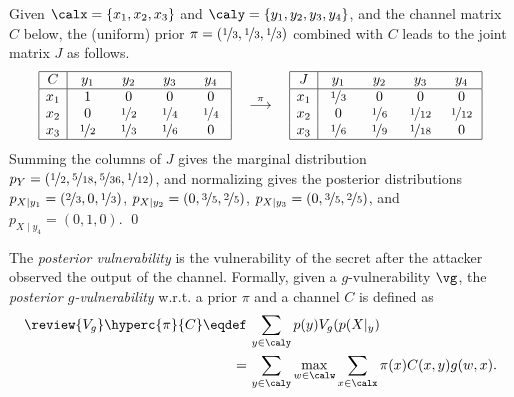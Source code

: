 \begin{example}
\label{exa:hypers}
Given $\calx=\{x_{1},x_{2},x_{3}\}$ and $\caly=\{y_{1},y_{2},y_{3},y_{4}\}$, 
and the channel matrix $C$ below, the (uniform) prior 
$\pi = (\nicefrac{1}{3}, \nicefrac{1}{3}, \nicefrac{1}{3})$ combined with
$C$ leads to the joint matrix $J$ as follows.
\begin{align*}
\begin{array}{|c|cccc|}
\hline
C & \,\,\,y_{1}\,\,\, & \,\,\,y_{2}\,\,\, & \,\,\,y_{3}\,\,\, & \,\,\,y_{4}\,\,\,
\\ \hline
x_{1} & 1 & 0 & 0 & 0 \\
x_{2} & 0 & \nicefrac{1}{2} & \nicefrac{1}{4} & \nicefrac{1}{4} \\
x_{3} & \nicefrac{1}{2} & \nicefrac{1}{3} & \nicefrac{1}{6} & 0 \\
\hline
\end{array}
\quad
\stackrel{\pi}{\longrightarrow}
\quad
\begin{array}{|c|cccc|}
\hline
J & \,\,\,y_{1}\,\,\, & \,\,\,y_{2}\,\,\, & \,\,\,y_{3}\,\,\, & \,\,\,y_{4}\,\,\, 
\\ \hline
x_{1} & \nicefrac{1}{3} & 0 & 0 & 0 \\
x_{2} & 0 & \nicefrac{1}{6} & \nicefrac{1}{12} & \nicefrac{1}{12} \\
x_{3} & \nicefrac{1}{6} & \nicefrac{1}{9} & \nicefrac{1}{18} & 0 \\
\hline
\end{array}
\end{align*}
Summing the columns of $J$ gives the marginal distribution 
$p_{Y}=(\nicefrac{1}{2},\nicefrac{5}{18},\nicefrac{5}{36},\nicefrac{1}{12})$,
and normalizing gives the posterior distributions
$p_{X \mid y_{1}} = (\nicefrac{2}{3},0,\nicefrac{1}{3})$,
$p_{X \mid y_{2}} = (0,\nicefrac{3}{5},\nicefrac{2}{5})$,
$p_{X \mid y_{3}} = (0,\nicefrac{3}{5},\nicefrac{2}{5})$, and
$p_{X \mid y_{4}} = (0,1,0)$.
\qed
\end{example}

The \emph{posterior vulnerability} is the vulnerability 
of the secret after the attacker observed the output of 
the channel.
Formally, given a $g$-vulnerability $\vg$, the 
\emph{posterior $g$-vulnerability} w.r.t. a prior $\pi$ and a channel $C$ 
is defined as
\begin{align*}
\review{V_g} \hyperc{\pi}{C}
\eqdef&\, \sum_{y \in \caly}p(y)V_g(p(X|_y) \\
=&\, \sum_{y \in \caly} \max_{w \in \calw} \sum_{x \in \calx} \pi(x) C({x,y}) g(w,x).
\end{align*}

